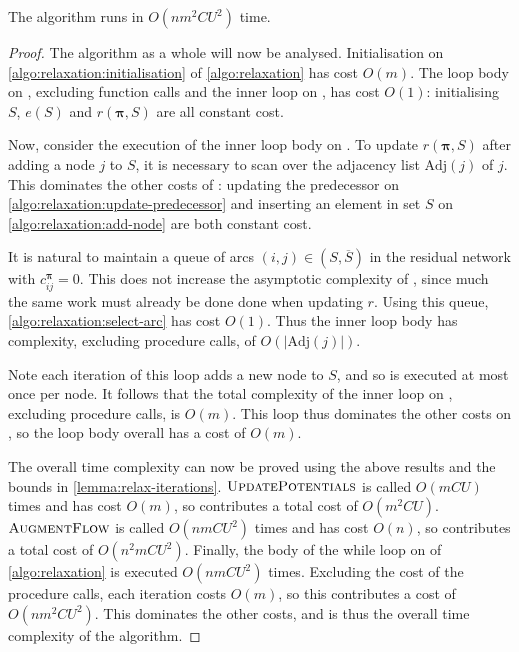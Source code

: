 \begin{thm} The algorithm runs in $O(nm^2CU^2)$ time.
\end{thm}
\begin{proof}
The algorithm as a whole will now be analysed. Initialisation on \cref{algo:relaxation:initialisation} of \cref{algo:relaxation} has cost $O(m)$. The loop body on , excluding function calls and the inner loop on , has cost $O(1)$: initialising $S$, $e(S)$ and $r(\boldsymbol{\pi},S)$ are all constant cost.

Now, consider the execution of the inner loop body on . To update $r(\boldsymbol{\pi},S)$ after adding a node $j$ to $S$, it is necessary to scan over the adjacency list $\mathrm{Adj}(j)$ of $j$. This dominates the other costs of : updating the predecessor on \cref{algo:relaxation:update-predecessor} and inserting an element in set $S$ on \cref{algo:relaxation:add-node} are both constant cost. 

It is natural to maintain a queue of arcs $(i,j) \in \left(S,\overline{S}\right)$ in the residual network with $c_{ij}^{\boldsymbol{\pi}}=0$. This does not increase the asymptotic complexity of , since much the same work must already be done done when updating $r$. Using this queue, \cref{algo:relaxation:select-arc} has cost $O(1)$. Thus the inner loop body has complexity, excluding procedure calls, of $O\left(\left|\mathrm{Adj}(j)\right|\right)$.

Note each iteration of this loop adds a new node to $S$, and so is executed at most once per node. It follows that the total complexity of the inner loop on , excluding procedure calls, is $O(m)$. This loop thus dominates the other costs on , so the loop body overall has a cost of $O(m)$.

The overall time complexity can now be proved using the above results and the bounds in \cref{lemma:relax-iterations}. $\textproc{UpdatePotentials}$ is called $O(mCU)$ times and has cost $O(m)$, so contributes a total cost of $O(m^2CU)$. $\textproc{AugmentFlow}$ is called $O(nmCU^2)$ times and has cost $O(n)$, so contributes a total cost of $O(n^2mCU^2)$. Finally, the body of the while loop on of \cref{algo:relaxation} is executed $O(nmCU^2)$ times. Excluding the cost of the procedure calls, each iteration costs $O(m)$, so this contributes a cost of $O(nm^2CU^2)$. This dominates the other costs, and is thus the overall time complexity of the algorithm.
\end{proof}

